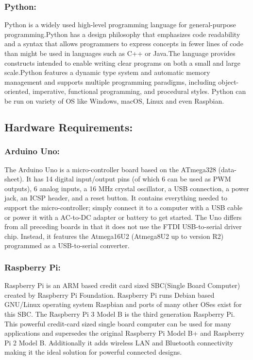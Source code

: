 \documentclass[14pt]{extarticle}
\begin{document}
\subsubsection{Python:}
{\quad}Python is a widely used high-level programming language for general-purpose programming.Python has a design philosophy that emphasizes code readability and a syntax that allows programmers to express concepts in fewer lines of code than might be used in languages such as C++ or Java.The language provides constructs intended to enable writing clear programs on both a small and large scale.Python features a dynamic type system and automatic memory management and supports multiple programming paradigms, including object-oriented, imperative, functional programming, and procedural styles. Python can be run on variety of OS like Windows, macOS, Linux and even Raspbian.


\subsection{Hardware Requirements:}
\subsubsection{Arduino Uno:}
{\quad}The Arduino Uno is a micro-controller board based on the ATmega328 (data-sheet). It has 14 digital input/output pins (of which 6 can be used as PWM outputs), 6 analog inputs, a 16 MHz crystal oscillator, a USB connection, a power jack, an ICSP header, and a reset button. It contains everything needed to support the micro-controller; simply connect it to a computer with a USB cable or power it with a AC-to-DC adapter or battery to get started.
The Uno differs from all preceding boards in that it does not use the FTDI USB-to-serial driver chip. Instead, it features the Atmega16U2 (Atmega8U2 up to version R2) programmed as a USB-to-serial converter.

\subsubsection{Raspberry Pi:}
{\quad}Raspberry Pi is an ARM based credit card sized SBC(Single Board Computer) created by Raspberry Pi Foundation. Raspberry Pi runs Debian based GNU/Linux operating system Raspbian and ports of many other OSes exist for this SBC.
The Raspberry Pi 3 Model B is the third generation Raspberry Pi. This powerful credit-card sized single board computer can be used for many applications and supersedes the original Raspberry Pi Model B+ and Raspberry Pi 2 Model B.
Additionally it adds wireless LAN and Bluetooth connectivity making it the ideal solution for powerful connected designs.
\end{document}
